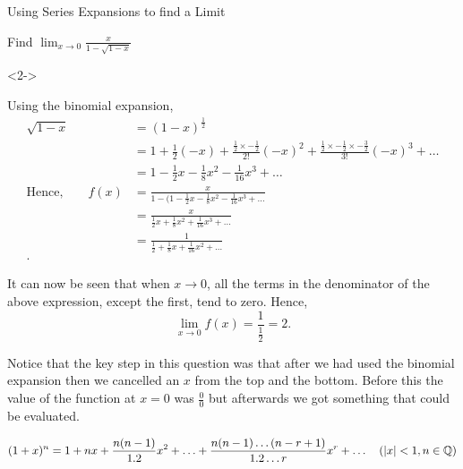 \documentclass[8pt]{beamer}
\begin{document}
\begin{frame}[shrink=20]{Using Series Expansions to find a Limit}
	\begin{problem}
		Find $\lim_{x \to 0} \frac{x}{1-\sqrt{1-x} }$
	\end{problem}
	\begin{solution}<2->
		\noindent
		\begin{minipage}{.7\linewidth}
			Using the binomial expansion,
			\begin{align*}
				\sqrt{1-x} &= (1-x)^{\frac{1}{2}} \\
					   &= 1+\frac{1}{2}(-x)+\frac{\frac{1}{2}\times -\frac{1}{2}}{2!}(-x)^2+\frac{\frac{1}{2}\times -\frac{1}{2}\times -\frac{3}{2}}{3!}(-x)^3+\ldots \\
					   &= 1-\frac{1}{2}x-\frac{1}{8}x^2-\frac{1}{16}x^3+\ldots \\
				\text{Hence,} \quad \quad f(x)&=\frac{x}{1-(1-\frac{1}{2}x-\frac{1}{8}x^2-\frac{1}{16}x^3+\ldots}  \\
				&= \frac{x}{\frac{1}{2}x+\frac{1}{8}x^2+\frac{1}{16}x^3+\ldots} \\
				&= \frac{1}{\frac{1}{2}+\frac{1}{8}x+\frac{1}{16}x^2+\ldots} \\
			.\end{align*}
		
			It can now be seen that when $x\to 0$, all the terms in the denominator of the above expression, except the first, tend to zero. Hence,
			\[
				\lim_{x \to 0} f(x)=\frac{1}{\frac{1}{2}}=2
			.\] 
		\end{minipage}%
		\begin{minipage}{.2\linewidth}
			\alert{Notice that the key step in this question was that after we had used the binomial expansion then we cancelled an $x$ from the top and the bottom. Before this the value of the function at $x=0$ was $\frac{0}{0}$ but afterwards we got something that could be evaluated.}
		\end{minipage}
	\end{solution}

	\[
		(1+x)^n=1+nx+\frac{n(n-1)}{1.2}x^2+\ldots+\frac{n(n-1)\ldots(n-r+1)}{1.2\ldots r}x^r+\ldots \quad ( |x| < 1, n \in \mathbb{Q})
	\] 
	
\end{frame}
\end{document}
